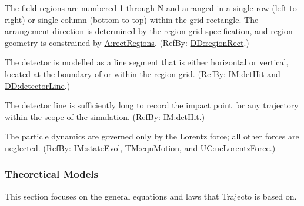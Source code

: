 \documentclass[12pt]{article}
\begin{document}
\begin{description}[font=\normalfont]
\item[gridLayout:\phantomsection\label{gridLayout}]{The field regions are numbered 1 through N and arranged in a single row (left-to-right) or single column (bottom-to-top) within the grid rectangle. The arrangement direction is determined by the region grid specification, and region geometry is constrained by \hyperref[rectRegions]{A:rectRegions}. (RefBy: \hyperref[DD:regionRect]{DD:regionRect}.)}
\item[lineDetector:\phantomsection\label{lineDetector}]{The detector is modelled as a line segment that is either horizontal or vertical, located at the boundary of or within the region grid. (RefBy: \hyperref[IM:detHit]{IM:detHit} and \hyperref[DD:detectorLine]{DD:detectorLine}.)}
\item[fullDetection:\phantomsection\label{fullDetection}]{The detector line is sufficiently long to record the impact point for any trajectory within the scope of the simulation. (RefBy: \hyperref[IM:detHit]{IM:detHit}.)}
\item[lorentzOnly:\phantomsection\label{lorentzOnly}]{The particle dynamics are governed only by the Lorentz force; all other forces are neglected. (RefBy: \hyperref[IM:stateEvol]{IM:stateEvol}, \hyperref[TM:eqnMotion]{TM:eqnMotion}, and \hyperref[ucLorentzForce]{UC:ucLorentzForce}.)}
\end{description}
\subsubsection{Theoretical Models}
\label{Sec:TMs}
This section focuses on the general equations and laws that Trajecto is based on.
\end{document}
